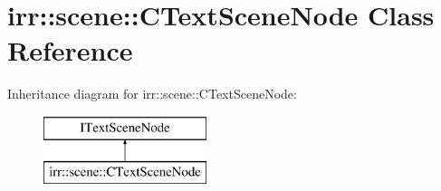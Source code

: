 \hypertarget{classirr_1_1scene_1_1_c_text_scene_node}{\section{irr\-:\-:scene\-:\-:C\-Text\-Scene\-Node Class Reference}
\label{classirr_1_1scene_1_1_c_text_scene_node}
}
Inheritance diagram for irr\-:\-:scene\-:\-:C\-Text\-Scene\-Node\-:\begin{figure}[H]
\begin{center}
\leavevmode
\includegraphics[height=2.000000cm]{classirr_1_1scene_1_1_c_text_scene_node}
\end{center}
\end{figure}

